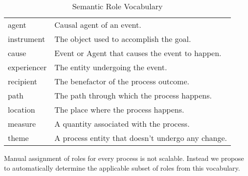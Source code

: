 \begin{table}[htdp]
\caption{Semantic Role Vocabulary}
\begin{center}
\begin{tabular}{|l|l|}
\hline
agent & Causal agent of an event.\\
instrument & The object used to accomplish the goal.\\
cause & Event or Agent that causes the event to happen.\\
experiencer & The entity undergoing the event. \\
recipient & The benefactor of the process outcome.\\
path & The path through which the process happens.\\
location & The place where the process happens.\\
measure & A quantity associated with the process.\\
theme & A process entity that doesn't undergo any change.\\
\hline

\end{tabular}
\end{center}
\label{tab:roles}
\end{table}%

Manual assignment of roles for every process is not scalable. 
Instead we propose to automatically determine the applicable subset of roles from this vocabulary. 
